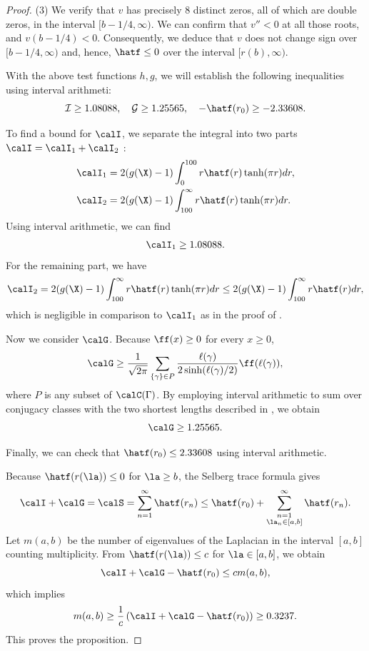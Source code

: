 \begin{proof}
(3)
We verify that \(v\) has precisely \(8\) distinct zeros, all of which are double zeros, in the interval \([b-1/4,\infty)\).
We can confirm that $v''<0$ at all those roots, and $v(b-1/4)<0$.
Consequently, we deduce that \(v\) does not change sign over \([b-1/4,\infty)\) and, hence, \(\hatf\leq 0 \) over the interval \([r(b),\infty)\).

With the above test functions $h,g$, we will establish the following inequalities using interval arithmeti:
\[
\mathcal{I} \geq 1.08088, \quad \mathcal{G} \geq 1.25565, \quad -\hatf(r_0) \geq -2.33608.
\]

To find a bound for $\calI$,
we separate the integral into two parts $\calI = \calI_1+\calI_2$ :
\begin{align*}
\calI_1 & = 2(g(\X)-1) \int_0^{100} r \hatf(r) \tanh(\pi r) dr,\\
\calI_2 & = 2(g(\X)-1) \int_{100}^\infty r \hatf(r) \tanh(\pi r) dr.
\end{align*}
Using interval arithmetic, we can find
\[
\calI_1 \geq 1.08088.
\]
For the remaining part, we have
\[
\calI_2 = 2(g(\X)-1) \int_{100}^\infty r \hatf(r) \tanh(\pi r) dr\leq 2(g(\X)-1) \int_{100}^\infty r \hatf(r)dr,
\]
which is negligible in comparison to $\calI_1$ as in the proof of .

Now we consider $\calG$.
Because $\ff(x)\geq 0$ for every $x \geq 0$,
\[
\calG \geq \frac{1}{\sqrt{2\pi}}\sum_{\{\gamma\} \in P} \frac{\ell(\gamma)}{2\sinh(\ell(\gamma)/2)} \ff(\ell(\gamma)),
\]
where $P$ is any subset of $\calC(\Gamma)$.
By employing interval arithmetic to sum over conjugacy classes with the two shortest lengths described in , we obtain
\[
\calG \geq 1.25565.
\]

Finally, we can check that $\hatf(r_0)\leq 2.33608$ using interval arithmetic.

Because $\hatf(r(\la))\leq 0$ for $\la \geq b$, the Selberg trace formula gives
\[
\calI+\calG = \calS = \sum_{n=1}^{\infty}\hatf(r_n)
\leq 
\hatf(r_0)+ \sum_{\substack{n=1 \\ \la_n\in [a,b]}}^{\infty}
\hatf(r_n).
\]
Let $m(a,b)$ be the number of eigenvalues of the Laplacian in the interval $[a,b]$ counting multiplicity.
From $\hatf(r(\la))\leq c$ for $\la\in [a,b]$, 
we obtain
\[
\calI+\calG - \hatf(r_0)  \leq  c m(a,b),
\]
which implies
\begin{equation}
m(a,b) \geq \frac{1}{c}\left(\calI+\calG - \hatf(r_0) \right) \geq 0.3237.
\end{equation}
This proves the proposition.
\end{proof}


